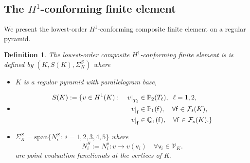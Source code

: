 \documentclass[twoside,reqno,final]{amsart}
\def\restrict#1{\raise-0.2ex\hbox{\ensuremath|}_{#1}}
\newcommand{\VT}{\mathcal{V}}
\newcommand{\FC}{\mathcal{F}}
\newcommand{\vt}{\mathsf{v}}
\newcommand{\fc}{\mathsf{f}}
\newtheorem{definition}[theorem]{Definition}
\newcommand{\pol}{\mathbb{P}}
\newcommand{\qol}{\mathbb{Q}}
\begin{document}
\subsection{The $H^1$-conforming finite element}
We present the lowest-order $H^1$-conforming composite finite element on 
a regular pyramid.
\begin{definition}
\label{H1-def}
The lowest-order 
composite $H^1$-conforming finite element is is defined by 
$(K, S(K), \Sigma^S_K)$ where
\begin{itemize}
\item $K$ is a regular pyramid with parallelogram base,
 \item
 \begin{alignat}{3}
\label{H1}
S(K) :=&\; \{v \in H^1(K):&& \;
v\restrict{T_\ell}\in \pol_2(T_\ell),\;\; \ell = 1,2,\\
& &&\;\;\; v\restrict{\fc}\in \pol_1(\fc),\quad\forall \fc\in \FC_t(K),\nonumber\\
& &&\;\;\; v\restrict{\fc}\in \qol_{1}(\fc),\quad\forall \fc\in \FC_s(K).\} \nonumber
\end{alignat}
\item $\Sigma_K^S = \mathrm{span}\{N_i^S:\; i=1,2,3,4,5\}$ where 
\[
N_i^S:= N_i^{\vt}: v\longrightarrow v(\vt_i)\quad \forall \vt_i\in \VT_K.
\]
are point evaluation functionals at the vertices of $K$.
\end{itemize}
\end{definition}
\end{document}
